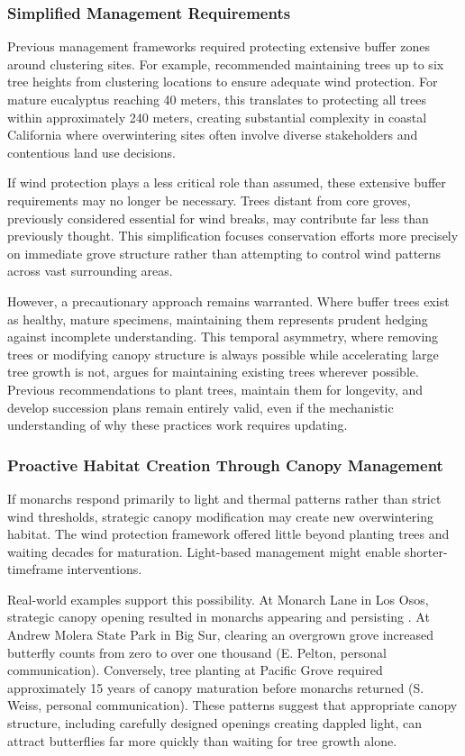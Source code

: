 \subsubsection{Simplified Management Requirements}

Previous management frameworks required protecting extensive buffer zones around clustering sites. For example, \textcite{althouse&meadeinc.EllwoodMesaSperling2023} recommended maintaining trees up to six tree heights from clustering locations to ensure adequate wind protection. For mature eucalyptus reaching 40 meters, this translates to protecting all trees within approximately 240 meters, creating substantial complexity in coastal California where overwintering sites often involve diverse stakeholders and contentious land use decisions.

If wind protection plays a less critical role than assumed, these extensive buffer requirements may no longer be necessary. Trees distant from core groves, previously considered essential for wind breaks, may contribute far less than previously thought. This simplification focuses conservation efforts more precisely on immediate grove structure rather than attempting to control wind patterns across vast surrounding areas.

However, a precautionary approach remains warranted. Where buffer trees exist as healthy, mature specimens, maintaining them represents prudent hedging against incomplete understanding. This temporal asymmetry, where removing trees or modifying canopy structure is always possible while accelerating large tree growth is not, argues for maintaining existing trees wherever possible. Previous recommendations to plant trees, maintain them for longevity, and develop succession plans remain entirely valid, even if the mechanistic understanding of why these practices work requires updating.

\subsubsection{Proactive Habitat Creation Through Canopy Management}

If monarchs respond primarily to light and thermal patterns rather than strict wind thresholds, strategic canopy modification may create new overwintering habitat. The wind protection framework offered little beyond planting trees and waiting decades for maturation. Light-based management might enable shorter-timeframe interventions.

Real-world examples support this possibility. At Monarch Lane in Los Osos, strategic canopy opening resulted in monarchs appearing and persisting \parencite{leongRestorationOverwinteringGrove1999,xercessocietyWesternMonarchThanksgiving2025}. At Andrew Molera State Park in Big Sur, clearing an overgrown grove increased butterfly counts from zero to over one thousand (E. Pelton, personal communication). Conversely, tree planting at Pacific Grove required approximately 15 years of canopy maturation before monarchs returned (S. Weiss, personal communication). These patterns suggest that appropriate canopy structure, including carefully designed openings creating dappled light, can attract butterflies far more quickly than waiting for tree growth alone.

